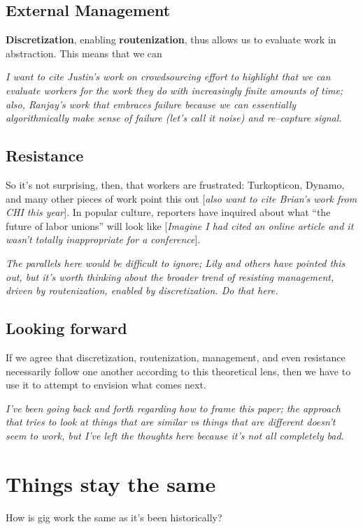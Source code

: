 \documentclass{sigchi}
\begin{document}
\subsection{External Management}
\textbf{Discretization}, enabling \textbf{routenization}, thus allows us to
evaluate work in abstraction.
This means that we can 

\textit{I want to cite Justin's work on crowdsourcing effort to highlight that
we can evaluate workers for the work they do with increasingly finite amounts of time;
also, Ranjay's work that embraces failure because
we can essentially algorithmically make sense of failure (let's call it noise)
and re--capture signal.}


\subsection{Resistance}
So it's not surprising, then, that workers are frustrated:
Turkopticon, Dynamo, and many other pieces of work point this out
\cite{turkopticon,dynamo,uberAlgorithm}
[\textit{also want to cite Brian's work from CHI this year}].
In popular culture, reporters have inquired about
what ``the future of labor unions'' will look like
[\textit{Imagine I had cited an online article and
it wasn't totally inappropriate for a conference}].

\textit{The parallels here would be difficult to ignore;
Lily and others have pointed this out,
but it's worth thinking about the broader trend of
resisting management,
driven by routenization,
enabled by discretization.
Do that here.}



\subsection{Looking forward}
If we agree that
discretization,
routenization,
management,
and even resistance
necessarily follow one another according to this theoretical lens,
then we have to use it to attempt to envision
what comes next.



\textit{I've been going back and forth regarding how to frame this paper;
the approach that tries to look at
things that are similar vs things that are different
doesn't seem to work, but
I've left the thoughts here because it's not all completely bad.}

\section{Things stay the same}
How is gig work the same as it's been historically?
\end{document}
